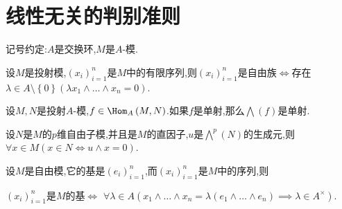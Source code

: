 \section{线性无关的判别准则}

记号约定:$A$是交换环,$M$是$A$-模.

\begin{proposition}{}{}
	设$M$是投射模,$\left(x_{i}\right)_{i=1}^{n}$是$M$中的有限序列,则$\left(x_{i}\right)_{i=1}^{n}$是自由族$\iff$存在$\lambda\in A\setminus\left\{0\right\}\left(\lambda x_{1}\wedge\ldots\wedge x_{n}=0\right)$.
\end{proposition}

\begin{corollary}{}{}
	设$M,N$是投射$A$-模,$f\in\Hom_{A}\left(M,N\right)$.如果$f$是单射,那么$\bigwedge\left(f\right)$是单射.
\end{corollary}

\begin{proposition}{}{}
	设$N$是$M$的$p$维自由子模,并且是$M$的直因子,$u$是$\bigwedge\limits^{p}\left(N\right)$的生成元,则$\forall x\in M\left(x\in N\iff u\wedge x=0\right)$.
\end{proposition}

\begin{theorem}{}{}
	设$M$是自由模,它的基是$\left(e_{i}\right)_{i=1}^{n}$,而$\left(x_{i}\right)_{i=1}^{n}$是$M$中的序列,则
	\begin{center}
		$\left(x_{i}\right)_{i=1}^{n}$是$M$的基$\iff$ $\forall\lambda\in A\left(x_{1}\wedge\ldots\wedge x_{n}=\lambda\left(e_{1}\wedge\ldots\wedge e_{n}\right)\implies\lambda\in A^{\times}\right)$.
	\end{center}
\end{theorem}


























